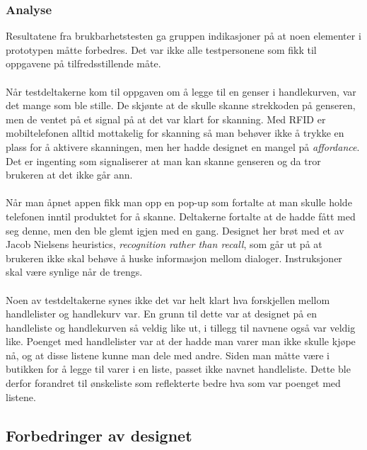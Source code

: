 \subsubsection{Analyse}
Resultatene fra brukbarhetstesten ga gruppen indikasjoner på at noen elementer i prototypen måtte forbedres. Det var ikke alle testpersonene som fikk til oppgavene på tilfredsstillende måte.
\\\\
Når testdeltakerne kom til oppgaven om å legge til en genser i handlekurven, var det mange som ble stille. De skjønte at de skulle skanne strekkoden på genseren, men de ventet på et signal på at det var klart for skanning. Med RFID er mobiltelefonen alltid mottakelig for skanning så man behøver ikke å trykke en plass for å aktivere skanningen, men her hadde designet en mangel på \textit{affordance}. Det er ingenting som signaliserer at man kan skanne genseren og da tror brukeren at det ikke går ann. 
\\\\
Når man åpnet appen fikk man opp en pop-up som fortalte at man skulle holde telefonen inntil produktet for å skanne. Deltakerne fortalte at de hadde fått med seg denne, men den ble glemt igjen med en gang. Designet her brøt med et av Jacob Nielsens heuristics, \textit{recognition rather than recall}, som går ut på at brukeren ikke skal behøve å huske informasjon mellom dialoger. Instruksjoner skal være synlige når de trengs\cite[p.~501]{preece}. 
\\\\
Noen av testdeltakerne synes ikke det var helt klart hva forskjellen mellom handlelister og handlekurv var. En grunn til dette var at designet på en handleliste og handlekurven så veldig like ut, i tillegg til navnene også var veldig like. Poenget med handlelister var at der hadde man varer man ikke skulle kjøpe nå, og at disse listene kunne man dele med andre. Siden man måtte være i butikken for å legge til varer i en liste, passet ikke navnet handleliste. Dette ble derfor forandret til ønskeliste som reflekterte bedre hva som var poenget med listene. 


\subsection{Forbedringer av designet}

